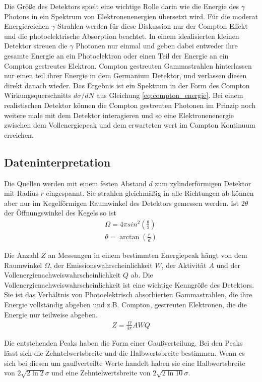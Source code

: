 Die Größe des Detektors spielt eine wichtige Rolle darin wie die Energie des
$\gamma$ Photons in ein Spektrum von Elektronenenergien übersetzt wird. Für die
moderat Energiereichen $\gamma$ Strahlen werden für diese Diskussion nur der
Compton Effekt und die photoelektrische Absorption beachtet. In einem
idealisierten kleinen Detektor streuen die $\gamma$ Photonen nur einmal und
geben dabei entweder ihre gesamte Energie an ein Photoelektron oder einen Teil
der Energie an ein Compton gestreutes Elektron. Compton gestreuten
Gammastrahlen hinterlassen nur einen teil ihrer Energie in dem Germanium
Detektor, und verlassen diesen direkt danach wieder. Das Ergebnis ist ein
Spektrum in der Form des Compton Wirkungsquerschnitts $d\sigma/dN$ aus
Gleichung \eqref{eq:compton_energie}. Bei einem realistischen Detektor können
die Compton gestreuten Photonen im Prinzip noch weitere male mit dem Detektor
interagieren und so eine Elektronenenergie zwischen dem Vollenergiepeak und dem
erwarteten wert im Compton Kontinuum erreichen.


\subsection{Dateninterpretation}
Die Quellen werden mit einem festen Abstand $d$ zum zylinderförmigen Detektor mit Radius $r$  eingespannt.
Sie strahlen gleichmäßig in alle Richtungen ab können aber nur im Kegelförmigen Raumwinkel des Detektors gemessen werden.
Ist $2\theta$ der Öffnungswinkel des Kegels so ist \cite{wiki:raum}
\begin{align}
	\Omega = 4 \pi sin^2\left(\frac{\theta}{2}\right) \\
	\theta = \arctan \left(\frac{r}{d} \right)
\end{align}\label{eq:raumwinkel}

Die Anzahl $Z$ an Messungen in einem bestimmten Energiepeak hängt von dem Raumwinkel $\Omega$, der 
Emissionswahrscheinlichkeit $W$, der Aktivität $A$ und der Vollenergienachweiswahrscheinlichkeit $Q$ ab.
Die Vollenergienachweiswahrscheinlichkeit ist eine wichtige Kenngröße des Detektors. Sie ist das Verhältnis 
von Photoelektrisch absorbierten Gammastrahlen, die ihre Energie vollständig abgeben und z.B. Compton,
gestreuten Elektronen, die die Energie nur teilweise abgeben.
\begin{align}
	Z = \frac{\Omega}{4\pi} A W Q
	\label{eq:Q}
\end{align}

Die entstehenden Peaks haben die Form einer Gaußverteilung.
Bei den Peaks lässt sich die Zehntelwertsbreite und die Halbwertsbreite bestimmen.
Wenn es sich bei diesen um gaußverteilte Werte handelt haben sie eine Halbwertsbreite von $2\sqrt{2\ln 2} \sigma$
und eine Zehntelwertsbreite von $2 \sqrt{2\ln 10}\sigma$.






